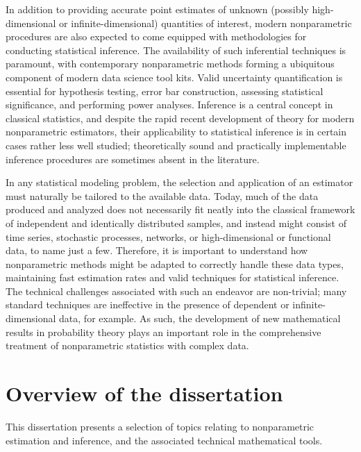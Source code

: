 \documentclass[11pt,lof]{puthesis}
\theoremstyle{break}
\theoremstyle{proof}
\begin{document}
In addition to providing accurate point estimates of unknown (possibly
high-dimensional or infinite-dimensional) quantities of interest, modern
nonparametric procedures are also expected to come equipped with methodologies
for conducting statistical inference. The availability of such inferential
techniques is paramount, with contemporary nonparametric methods forming a
ubiquitous component of modern data science tool kits. Valid uncertainty
quantification is essential for hypothesis testing, error bar construction,
assessing statistical significance, and performing power analyses. Inference is
a central concept in classical statistics, and despite the rapid
recent development of theory for modern nonparametric estimators, their
applicability to statistical inference is in certain cases rather less well
studied; theoretically sound and practically implementable inference procedures
are sometimes absent in the literature.

In any statistical modeling problem, the selection and application of an
estimator must naturally be tailored to the available data. Today, much of the
data produced and analyzed does not necessarily fit neatly into the classical
framework of independent and identically distributed samples, and instead might
consist of time series, stochastic processes, networks,
or high-dimensional or functional data, to name just a few.
Therefore, it is important to understand how nonparametric methods might be
adapted to correctly handle these data types, maintaining fast estimation rates
and valid techniques for statistical inference. The technical challenges
associated with such an endeavor are non-trivial; many standard techniques are
ineffective in the presence of dependent or infinite-dimensional data, for
example. As such, the development of new mathematical results in probability
theory plays an important role in the comprehensive treatment of nonparametric
statistics with complex data.

\section*{Overview of the dissertation}

This dissertation presents a selection of topics relating to nonparametric
estimation and inference, and the associated technical mathematical tools.
\end{document}
